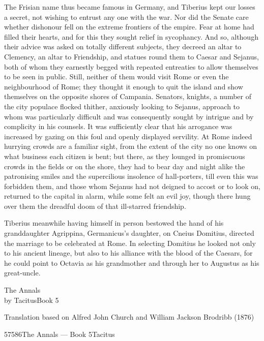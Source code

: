 
The Frisian name thus became famous in Germany, and Tiberius kept our losses a secret, not wishing to entrust any one with the war. Nor did the Senate care whether dishonour fell on the extreme frontiers of the empire. Fear at home had filled their hearts, and for this they sought relief in sycophancy. And so, although their advice was asked on totally different subjects, they decreed an altar to Clemency, an altar to Friendship, and statues round them to Caesar and Sejanus, both of whom they earnestly begged with repeated entreaties to allow themselves to be seen in public. Still, neither of them would visit Rome or even the neighbourhood of Rome; they thought it enough to quit the island and show themselves on the opposite shores of Campania. Senators, knights, a number of the city populace flocked thither, anxiously looking to Sejanus, approach to whom was particularly difficult and was consequently sought by intrigue and by complicity in his counsels. It was sufficiently clear that his arrogance was increased by gazing on this foul and openly displayed servility. At Rome indeed hurrying crowds are a familiar sight, from the extent of the city no one knows on what business each citizen is bent; but there, as they lounged in promiscuous crowds in the fields or on the shore, they had to bear day and night alike the patronising smiles and the supercilious insolence of hall-porters, till even this was forbidden them, and those whom Sejanus had not deigned to accost or to look on, returned to the capital in alarm, while some felt an evil joy, though there hung over them the dreadful doom of that ill-starred friendship.


Tiberius meanwhile having himself in person bestowed the hand of his granddaughter Agrippina, Germanicus's daughter, on Cneius Domitius, directed the marriage to be celebrated at Rome. In selecting Domitius he looked not only to his ancient lineage, but also to his alliance with the blood of the Caesars, for he could point to Octavia as his grandmother and through her to Augustus as his great-uncle.


The Annals\\
by TacitusBook 5

Translation based on Alfred John Church and William Jackson Brodribb (1876)

57586The Annals — Book 5Tacitus

